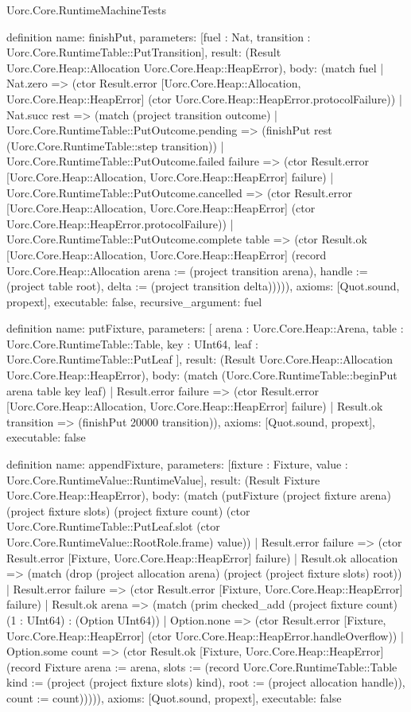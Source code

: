 \begin{lexlean}{Uorc.Core.RuntimeMachineTests}
\begin{semanticmodule}
definition{
  name: finishPut,
  parameters: [fuel : Nat, transition : Uorc.Core.RuntimeTable::PutTransition],
  result: (Result Uorc.Core.Heap::Allocation Uorc.Core.Heap::HeapError),
  body: (match fuel
    | Nat.zero => (ctor Result.error [Uorc.Core.Heap::Allocation, Uorc.Core.Heap::HeapError] (ctor Uorc.Core.Heap::HeapError.protocolFailure))
    | Nat.succ rest => (match (project transition outcome)
      | Uorc.Core.RuntimeTable::PutOutcome.pending => (finishPut rest (Uorc.Core.RuntimeTable::step transition))
      | Uorc.Core.RuntimeTable::PutOutcome.failed failure => (ctor Result.error [Uorc.Core.Heap::Allocation, Uorc.Core.Heap::HeapError] failure)
      | Uorc.Core.RuntimeTable::PutOutcome.cancelled => (ctor Result.error [Uorc.Core.Heap::Allocation, Uorc.Core.Heap::HeapError] (ctor Uorc.Core.Heap::HeapError.protocolFailure))
      | Uorc.Core.RuntimeTable::PutOutcome.complete table => (ctor Result.ok [Uorc.Core.Heap::Allocation, Uorc.Core.Heap::HeapError] (record Uorc.Core.Heap::Allocation {arena := (project transition arena), handle := (project table root), delta := (project transition delta)})))),
  axioms: [Quot.sound, propext],
  executable: false,
  recursive_argument: fuel
}

definition{
  name: putFixture,
  parameters: [
    arena : Uorc.Core.Heap::Arena,
    table : Uorc.Core.RuntimeTable::Table,
    key : UInt64,
    leaf : Uorc.Core.RuntimeTable::PutLeaf
  ],
  result: (Result Uorc.Core.Heap::Allocation Uorc.Core.Heap::HeapError),
  body: (match (Uorc.Core.RuntimeTable::beginPut arena table key leaf)
    | Result.error failure => (ctor Result.error [Uorc.Core.Heap::Allocation, Uorc.Core.Heap::HeapError] failure)
    | Result.ok transition => (finishPut 20000 transition)),
  axioms: [Quot.sound, propext],
  executable: false
}

definition{
  name: appendFixture,
  parameters: [fixture : Fixture, value : Uorc.Core.RuntimeValue::RuntimeValue],
  result: (Result Fixture Uorc.Core.Heap::HeapError),
  body: (match (putFixture (project fixture arena) (project fixture slots) (project fixture count) (ctor Uorc.Core.RuntimeTable::PutLeaf.slot (ctor Uorc.Core.RuntimeValue::RootRole.frame) value))
    | Result.error failure => (ctor Result.error [Fixture, Uorc.Core.Heap::HeapError] failure)
    | Result.ok allocation => (match (drop (project allocation arena) (project (project fixture slots) root))
      | Result.error failure => (ctor Result.error [Fixture, Uorc.Core.Heap::HeapError] failure)
      | Result.ok arena => (match (prim checked_add (project fixture count) (1 : UInt64) : (Option UInt64))
        | Option.none => (ctor Result.error [Fixture, Uorc.Core.Heap::HeapError] (ctor Uorc.Core.Heap::HeapError.handleOverflow))
        | Option.some count => (ctor Result.ok [Fixture, Uorc.Core.Heap::HeapError] (record Fixture {arena := arena, slots := (record Uorc.Core.RuntimeTable::Table {kind := (project (project fixture slots) kind), root := (project allocation handle)}), count := count}))))),
  axioms: [Quot.sound, propext],
  executable: false
}


\end{semanticmodule}
\end{lexlean}

